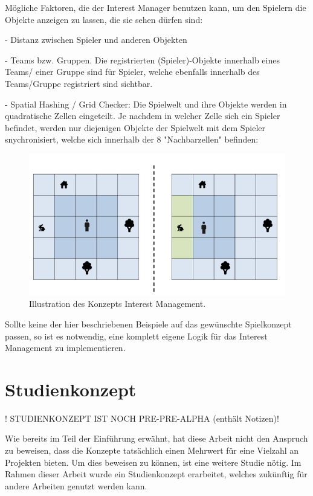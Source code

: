 Mögliche Faktoren, die der Interest Manager benutzen kann, um den Spielern die Objekte anzeigen zu lassen, die sie sehen dürfen sind:

- Distanz zwischen Spieler und anderen Objekten

- Teams bzw. Gruppen. Die registrierten (Spieler)-Objekte innerhalb eines Teams/ einer Gruppe sind für Spieler, welche ebenfalls innerhalb des Teams/Gruppe registriert sind sichtbar.

- Spatial Hashing / Grid Checker: Die Spielwelt und ihre Objekte werden in quadratische Zellen eingeteilt. Je nachdem in welcher Zelle sich ein Spieler befindet, werden nur diejenigen Objekte der Spielwelt mit dem Spieler snychronisiert, welche sich innerhalb der 8 "Nachbarzellen" befinden:

\begin{figure}
	\centering
	\includegraphics[width=150mm]{images/interest_management.png}
	\caption[Interest Management]{Illustration des Konzepts Interest Management. \cite{JeromeRenaux.2017} }
	\label{pic:interest_management}
\end{figure}

Sollte keine der hier beschriebenen Beispiele auf das gewünschte Spielkonzept passen, so ist es notwendig, eine komplett eigene Logik für das Interest Management zu implementieren.

\section{Studienkonzept}
\label{studienkonzept}

! STUDIENKONZEPT IST NOCH PRE-PRE-ALPHA (enthält Notizen)!

Wie bereits im Teil der Einführung erwähnt, hat diese Arbeit nicht den Anspruch zu beweisen, dass die Konzepte tatsächlich einen Mehrwert für eine Vielzahl an Projekten bieten. Um dies beweisen zu können, ist eine weitere Studie nötig. Im Rahmen dieser Arbeit wurde ein Studienkonzept erarbeitet, welches zukünftig für andere Arbeiten genutzt werden kann.

